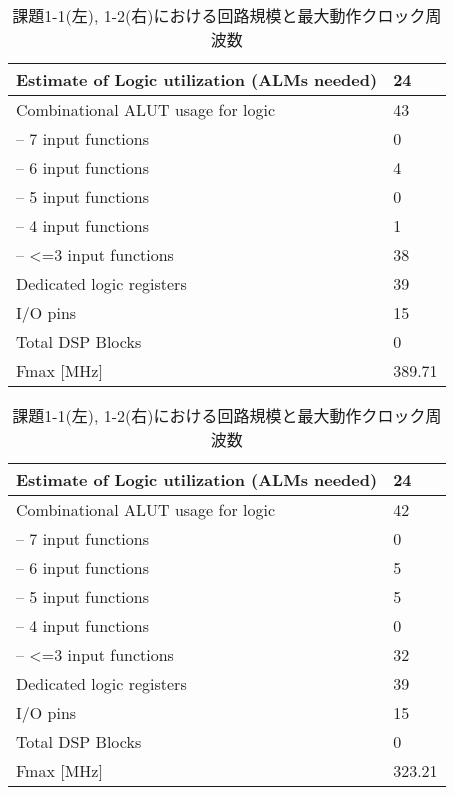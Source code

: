 \begin{table}[h]
    \caption{課題1-1(左), 1-2(右)における回路規模と最大動作クロック周波数}\label{tab:basic1}
    \begin{tabular}{|l|l|}
    \hline
    Estimate of Logic utilization (ALMs needed) & 24 \\\hline
    Combinational ALUT usage for logic          & 43 \\\hline
    -- 7 input functions                        & 0  \\\hline
    -- 6 input functions                        & 4  \\\hline
    -- 5 input functions                        & 0  \\\hline
    -- 4 input functions                        & 1  \\\hline
    -- \textless{}=3 input functions            & 38 \\\hline
    Dedicated logic registers                   & 39 \\\hline
    I/O pins                                    & 15 \\\hline
    Total DSP Blocks                            & 0  \\\hline
    Fmax [MHz]                                       & 389.71 \\\hline
    \end{tabular}
    \begin{tabular}{|l|l|}
        \hline
        Estimate of Logic utilization (ALMs needed) & 24 \\\hline
        Combinational ALUT usage for logic          & 42 \\\hline
        -- 7 input functions                        & 0  \\\hline
        -- 6 input functions                        & 5  \\\hline
        -- 5 input functions                        & 5  \\\hline
        -- 4 input functions                        & 0  \\\hline
        -- \textless{}=3 input functions            & 32 \\\hline
        Dedicated logic registers                   & 39 \\\hline
        I/O pins                                    & 15 \\\hline
        Total DSP Blocks                            & 0 \\\hline
        Fmax [MHz]                                       & 323.21 \\\hline
    \end{tabular}
\end{table}

